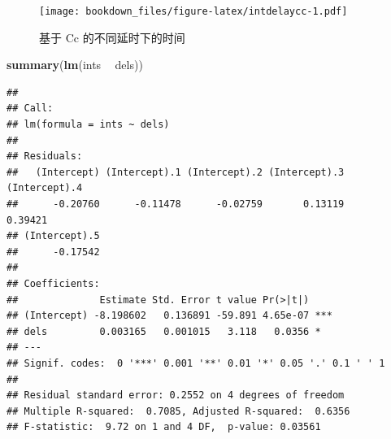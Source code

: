 \documentclass[
]{krantz}
\makeatletter
\newenvironment{Shaded}{\begin{snugshade}}{\end{snugshade}}
\newcommand{\CommentTok}[1]{\textcolor[rgb]{0.56,0.35,0.01}{\textit{#1}}}
\newcommand{\DecValTok}[1]{\textcolor[rgb]{0.00,0.00,0.81}{#1}}
\newcommand{\KeywordTok}[1]{\textcolor[rgb]{0.13,0.29,0.53}{\textbf{#1}}}
\newcommand{\NormalTok}[1]{#1}
\newcommand{\OperatorTok}[1]{\textcolor[rgb]{0.81,0.36,0.00}{\textbf{#1}}}
\newcommand{\StringTok}[1]{\textcolor[rgb]{0.31,0.60,0.02}{#1}}
\newenvironment{kframe}{%
\medskip{}
\setlength{\fboxsep}{.8em}
 \def\at@end@of@kframe{}%
 \ifinner\ifhmode%
  \def\at@end@of@kframe{\end{minipage}}%
  \begin{minipage}{\columnwidth}%
 \fi\fi%
 \def\FrameCommand##1{\hskip\@totalleftmargin \hskip-\fboxsep
 \colorbox{shadecolor}{##1}\hskip-\fboxsep
     \hskip-\linewidth \hskip-\@totalleftmargin \hskip\columnwidth}%
 \MakeFramed {\advance\hsize-\width
   \@totalleftmargin\z@ \linewidth\hsize
   \@setminipage}}%
 {\par\unskip\endMakeFramed%
 \at@end@of@kframe}
\renewenvironment{Shaded}{\begin{kframe}}{\end{kframe}}
\makeatother
\begin{document}
\begin{figure}
\centering
\texttt{[image: bookdown\_files/figure-latex/intdelaycc-1.pdf]}
\caption{\label{fig:intdelaycc}基于 Cc 的不同延时下的时间}
\end{figure}

\begin{Shaded}
\begin{Highlighting}[]
\KeywordTok{summary}\NormalTok{(}\KeywordTok{lm}\NormalTok{(ints }\OperatorTok{~}\StringTok{ }\NormalTok{dels))}
\end{Highlighting}
\end{Shaded}

\begin{verbatim}
## 
## Call:
## lm(formula = ints ~ dels)
## 
## Residuals:
##   (Intercept) (Intercept).1 (Intercept).2 (Intercept).3 (Intercept).4 
##      -0.20760      -0.11478      -0.02759       0.13119       0.39421 
## (Intercept).5 
##      -0.17542 
## 
## Coefficients:
##              Estimate Std. Error t value Pr(>|t|)    
## (Intercept) -8.198602   0.136891 -59.891 4.65e-07 ***
## dels         0.003165   0.001015   3.118   0.0356 *  
## ---
## Signif. codes:  0 '***' 0.001 '**' 0.01 '*' 0.05 '.' 0.1 ' ' 1
## 
## Residual standard error: 0.2552 on 4 degrees of freedom
## Multiple R-squared:  0.7085, Adjusted R-squared:  0.6356 
## F-statistic:  9.72 on 1 and 4 DF,  p-value: 0.03561
\end{verbatim}

\begin{Shaded}
\end{Shaded}
\end{document}
